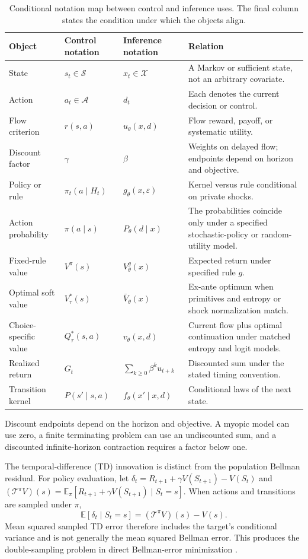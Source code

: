 \begin{table}[H]
\centering
\caption{Conditional notation map between control and inference uses. The final column states the condition under which the objects align.}
\label{tab:notation}
\small
\begin{tabular}{>{\raggedright\arraybackslash}p{2.6cm}>{\raggedright\arraybackslash}p{2.9cm}>{\raggedright\arraybackslash}p{3.0cm}>{\raggedright\arraybackslash}p{5.0cm}}
\toprule
Object & Control notation & Inference notation & Relation \\
\midrule
State & $s_t\in\mathcal{S}$ & $x_t\in\mathcal{X}$ & A Markov or sufficient state, not an arbitrary covariate. \\
Action & $a_t\in\mathcal{A}$ & $d_t$ & Each denotes the current decision or control. \\
Flow criterion & $r(s,a)$ & $u_\theta(x,d)$ & Flow reward, payoff, or systematic utility. \\
Discount factor & $\gamma$ & $\beta$ & Weights on delayed flow; endpoints depend on horizon and objective. \\
Policy or rule & $\pi_t(a\mid H_t)$ & $g_\theta(x,\varepsilon)$ & Kernel versus rule conditional on private shocks. \\
Action probability & $\pi(a\mid s)$ & $P_\theta(d\mid x)$ & The probabilities coincide only under a specified stochastic-policy or random-utility model. \\
Fixed-rule value & $V^\pi(s)$ & $V^g_\theta(x)$ & Expected return under specified rule $g$. \\
Optimal soft value & $V^*_{\tau}(s)$ & $\bar V_\theta(x)$ & Ex-ante optimum when primitives and entropy or shock normalization match. \\
Choice-specific value & $Q^*_{\tau}(s,a)$ & $v_\theta(x,d)$ & Current flow plus optimal continuation under matched entropy and logit models. \\
Realized return & $G_t$ & $\sum_{k\geq0}\beta^k u_{t+k}$ & Discounted sum under the stated timing convention. \\
Transition kernel & $P(s'\mid s,a)$ & $f_\theta(x'\mid x,d)$ & Conditional laws of the next state. \\
\bottomrule
\end{tabular}
\end{table}

Discount endpoints depend on the horizon and objective. A myopic model can use zero, a finite terminating problem can use an undiscounted sum, and a discounted infinite-horizon contraction requires a factor below one.

The temporal-difference (TD) innovation is distinct from the population Bellman residual. For policy evaluation, let $\delta_t=R_{t+1}+\gamma V(S_{t+1})-V(S_t)$ and $(\mathcal{T}^\pi V)(s)=\mathbb{E}_\pi[R_{t+1}+\gamma V(S_{t+1})\mid S_t=s]$. When actions and transitions are sampled under $\pi$,
\[
\mathbb{E}[\delta_t\mid S_t=s]
=(\mathcal{T}^\pi V)(s)-V(s).
\]
Mean squared sampled TD error therefore includes the target's conditional variance and is not generally the mean squared Bellman error. This produces the double-sampling problem in direct Bellman-error minimization \citep{sutton2018}.
